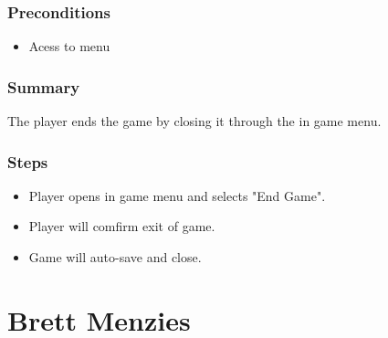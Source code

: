 \documentclass[12pt]{report}
\begin{document}
        \subsubsection{Preconditions}
        \begin{itemize}
            \item Acess to menu
        \end{itemize}

        \subsubsection{Summary}
        The player ends the game by closing it through the in game menu.

        \subsubsection{Steps}
        \begin{itemize}
            \item Player opens in game menu and selects "End Game".
            \item Player will comfirm exit of game.
            \item Game will auto-save and close.
        \end{itemize}






\section{Brett Menzies}
\end{document}
